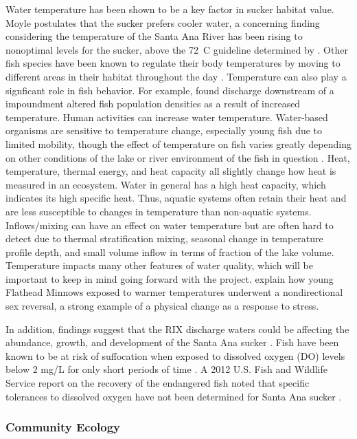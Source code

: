 \documentclass{article}\usepackage[]{graphicx}\usepackage[]{color}
\begin{document}
Water temperature has been shown to be a key factor in sucker habitat value. Moyle \citet{moyle2002inland} postulates that the sucker prefers cooler water, a concerning finding considering the temperature of the Santa Ana River has been rising to nonoptimal levels for the sucker, above the 72\textdegree~C guideline determined by \citet{baskerville2012recovery}. Other fish species have been known to regulate their body temperatures by moving to different areas in their habitat throughout the day \citep{matthews1994cool}. Temperature can also play a signficant role in fish behavior. For example, \citet{sadler1980effect} found discharge downstream of a impoundment altered fish population densities as a result of increased temperature. Human activities can increase water temperature. Water-based organisms are sensitive to temperature change, especially young fish due to limited mobility, though the effect of temperature on fish varies greatly depending on other conditions of the lake or river environment of the fish in question \citep{loshuertos16}. Heat, temperature, thermal energy, and heat capacity all slightly change how heat is measured in an ecosystem. Water in general has a high heat capacity, which indicates its high specific heat. Thus, aquatic systems often retain their heat and are less susceptible to changes in temperature than non-aquatic systems. Inflows/mixing can have an effect on water temperature but are often hard to detect due to thermal stratification mixing, seasonal change in temperature profile depth, and small volume inflow in terms of fraction of the lake volume. Temperature impacts many other features of water quality, which will be important to keep in mind going forward with the project. \citet{coulter2015fluctuating} explain how young Flathead Minnows exposed to warmer temperatures underwent a nondirectional sex reversal, a strong example of a physical change as a response to stress.

In addition, findings suggest that the RIX discharge waters could be affecting the abundance, growth, and development of the Santa Ana sucker \citep{jenkins2009effects}. Fish have been known to be at risk of suffocation when exposed to dissolved oxygen (DO) levels below 2 mg/L for only short periods of time \citep{REF}. A 2012 U.S. Fish and Wildlife Service report on the recovery of the endangered fish noted that specific tolerances to dissolved oxygen have not been determined for  Santa Ana sucker \citep{evans2005draft}.

\subsubsection{Community Ecology}
\end{document}
